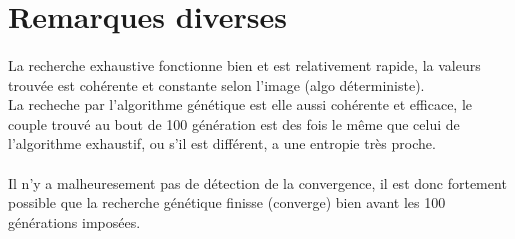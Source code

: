 \documentclass{article}
\begin{document}
\section{Remarques diverses} %
\label{sec:Remarque}
\paragraph{} %
\label{par:}

  La recherche exhaustive fonctionne bien et est relativement rapide, la valeurs trouvée
  est cohérente et constante selon l'image (algo déterministe).\\
  La recheche par l'algorithme génétique est elle aussi cohérente et efficace, le couple
  trouvé au bout de 100 génération est des fois le même que celui de l'algorithme
  exhaustif, ou s'il est différent, a une entropie très proche.

  \paragraph{} %
  \label{par:}
  Il n'y a malheuresement pas de détection de la convergence, il est donc fortement
  possible que la recherche génétique finisse (converge) bien avant les 100 générations
  imposées.

\end{document}
